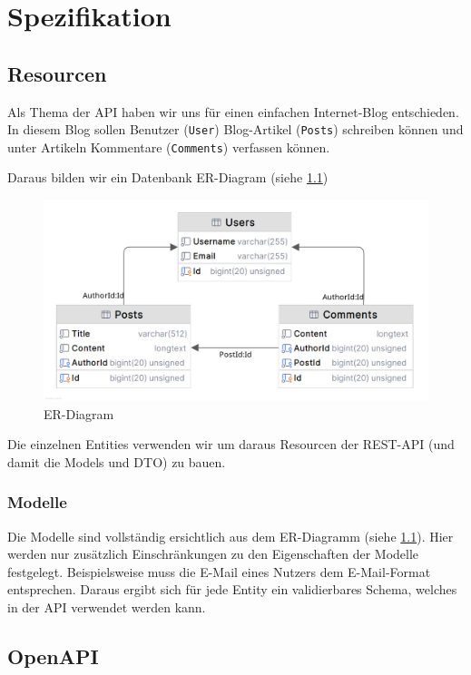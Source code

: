 \chapter{Spezifikation}

\section{Resourcen}
\label{sec:specification-resources}

Als Thema der API haben wir uns für einen einfachen Internet-Blog entschieden.
In diesem Blog sollen Benutzer (\texttt{User}) Blog-Artikel (\texttt{Posts}) schreiben können und unter Artikeln Kommentare (\texttt{Comments}) verfassen können. 

Daraus bilden wir ein Datenbank \ac{ER}-Diagram (siehe \ref{fig:blog-er-diagram})

\begin{figure}[hbp]
\centering
\includegraphics[width=0.8\linewidth]{Graphics/Database_ER.png}
\caption{ER-Diagram}
\label{fig:blog-er-diagram}
\end{figure}

Die einzelnen Entities verwenden wir um daraus Resourcen der REST-API (und damit die Models und \ac{DTO}) zu bauen.

\subsection{Modelle}
\label{subsec:specification-resources-models}

Die Modelle sind vollständig ersichtlich aus dem \ac{ER}-Diagramm (siehe \ref{fig:blog-er-diagram}). Hier werden nur zusätzlich Einschränkungen zu den Eigenschaften der Modelle festgelegt. Beispielsweise muss die E-Mail eines Nutzers dem E-Mail-Format entsprechen. Daraus ergibt sich für jede Entity ein validierbares Schema, welches in der API verwendet werden kann.

\section{OpenAPI}

